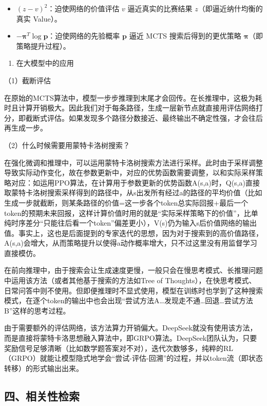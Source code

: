 \begin{itemize}
\tightlist
\item
  \((z-v)^2\)：迫使网络的价值评估 \(v\) 逼近真实的比赛结果 \(z\)（即逼近纳什均衡的真实 Value）。
\item
  \(-\boldsymbol{\pi}^{T}\log\mathbf{p}\)：迫使网络的先验概率 \(\mathbf{p}\) 逼近 MCTS 搜索后得到的更优策略 \(\boldsymbol{\pi}\)（即策略提升过程）。
\end{itemize}

\begin{enumerate}
\def\labelenumi{\arabic{enumi}.}
\setcounter{enumi}{2}
\tightlist
\item
  在大模型中的应用
\end{enumerate}

（1）截断评估

在原始的MCTS算法中，模型一步步推理到末尾才会回传。在长推理中，这极为耗时且计算开销极大。因此我们对于每条路径，生成一层新节点就直接用评估网络打分，即截断式评估。如果发现多个路径分数接近、最终输出不确定性强，才会往后再生成一步。

（2）什么时候需要用蒙特卡洛树搜索？

在强化微调和推理中，可以运用蒙特卡洛树搜索方法进行采样。此时由于采样调整导致实际动作变化，故在参数更新中，对应的优势函数需要调整，以和实际采样策略对应：如运用PPO算法，在计算用于参数更新的优势函数A(s,a)时，Q(s,a)直接取蒙特卡洛树搜索采样得到的路径中，从s出发所有经过a的路径的平均价值（比如生成一步就截断，则某条路径的价值=这一步各个token总实际回报+最后一个token的预期未来回报，这样计算价值时用的就是``实际采样策略下的价值''，比单纯时序差分``只能往后看一个token''偏差更小），V(s)仍为输入s后价值网络的输出值。事实上，这也是后面提到的专家迭代的思想，因为对于搜索到的高价值路径，A(s,a)会增大，从而策略提升以使得a动作概率增大，只不过这里没有用监督学习直接模仿。

在前向推理中，由于搜索会让生成速度更慢，一般只会在慢思考模式、长推理问题中运用该方法（或者其他基于搜索的方法如Tree of Thoughts），在快思考模式、日常问答中则不使用。但即便推理时不显式使用，模型在训练时也学到了这种搜索模式，在逐个token的输出中也会出现``尝试方法A\ldots 发现走不通\ldots 回退\ldots 尝试方法B''这样的思考过程。

由于需要额外的评估网络，该方法算力开销偏大。DeepSeek就没有使用该方法，而是直接将蒙特卡洛思想融入算法中，即GRPO算法。DeepSeek团队认为，只要奖励信号足够清晰（比如数学题答案对不对），迭代次数够多，纯粹的RL（GRPO）就能让模型隐式地学会``尝试-评估-回溯''的过程，并以token流（即状态转移）的形式输出出来。

\hypertarget{ux56dbux76f8ux5173ux6027ux68c0ux7d22}{%
\subsection{四、相关性检索}\label{ux56dbux76f8ux5173ux6027ux68c0ux7d22}}

